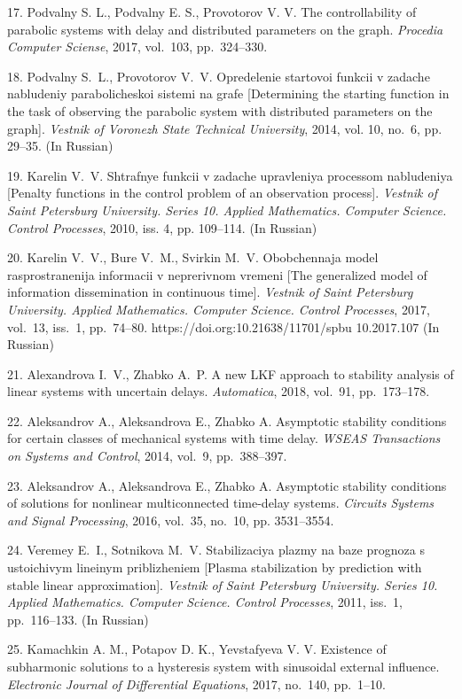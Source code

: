 {17. Podvalny S. L., Podvalny E. S.,  Provotorov V. V.  The
controllability of parabolic systems with delay and distributed
parameters on the graph. \emph{Procedia Computer Sciense}, 2017,
vol.~103, pp.~324--330.

18. Podvalny S.~L., Provotorov V.~V.  Opredelenie startovoi
funkcii v zadache nabludeniy parabolicheskoi sistemi na grafe
[Determining the starting function in the task of observing the
parabolic system with distributed parameters on the graph].
\emph{Vestnik of Voronezh State Technical University}, 2014, vol.
10, no.~6, pp. 29--35. (In Russian)

19. Karelin V.~V.  Shtrafnye funkcii v zadache upravleniya
processom nabludeniya [Penalty functions in the control problem of
an observation process]. \emph{Vestnik of Saint Petersburg
University. Series 10. Applied Mathematics. Computer Science.
Control Processes}, 2010, iss. 4, pp. 109--114. (In Russian)

20. Karelin V.~V., Bure V.~M., Svirkin M.~V. Obobchennaja model
rasprostranenija informacii v neprerivnom vremeni [The generalized
model of information dissemination in continuous time].
\textit{Vestnik of Saint Petersburg University. Applied
Mathematics. Computer Science. Control Processes}, 2017, vol.~13,
iss.~1, pp.~74--80. https://doi.org:10.21638/11701/spbu
10.2017.107 (In Russian)


21. Alexandrova I.~V., Zhabko A.~P.  A new LKF approach to
stability analysis of linear systems with uncertain delays.
\emph{Automatica}, 2018, vol.~91, pp.~173--178.

22. Aleksandrov A., Aleksandrova E., Zhabko A. Asymptotic
stability conditions for certain classes of mechanical systems
with time delay. \emph{WSEAS Transactions on Systems and Control},
2014, vol.~9, pp.~388--397.

23. Aleksandrov A., Aleksandrova E., Zhabko A. Asymptotic
stability conditions of solutions for nonlinear multiconnected
time-delay systems. \emph{Circuits  Systems and Signal
Processing}, 2016, vol.~35, no.~10, pp. 3531--3554.

24. Veremey E.~I., Sotnikova M.~V. Stabilizaciya plazmy na baze
prognoza s ustoichivym lineinym priblizheniem [Plasma
stabilization by prediction with stable linear approximation].
\emph{Vestnik of Saint Petersburg University. Series 10. Applied
Mathematics. Computer Science. Control Processes}, 2011, iss.~1,
pp.~116--133. (In Russian)

25. Kamachkin A. M., Potapov D. K., Yevstafyeva V. V. Existence of
subharmonic solutions to a hysteresis system with sinusoidal
external influence. \emph{Electronic Journal of Differential
Equations}, 2017, no.~140, pp.~1--10.

}
